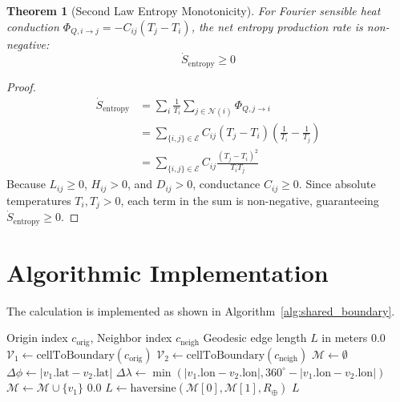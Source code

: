 \documentclass[10pt,twocolumn,letterpaper]{article}
\newtheorem{theorem}{Theorem}
\begin{document}
\begin{theorem}[Second Law Entropy Monotonicity]
For Fourier sensible heat conduction $\Phi_{Q, i \to j} = - C_{ij} (T_j - T_i)$, the net entropy production rate is non-negative:
\begin{equation}
\dot{S}_{\text{entropy}} \ge 0
\end{equation}
\end{theorem}
\begin{proof}
\begin{align}
\dot{S}_{\text{entropy}} &= \sum_{i} \frac{1}{T_i} \sum_{j \in \mathcal{N}(i)} \Phi_{Q, j \to i} \\
&= \sum_{\{i,j\} \in \mathcal{E}} C_{ij} (T_j - T_i) \left(\frac{1}{T_i} - \frac{1}{T_j}\right) \\
&= \sum_{\{i,j\} \in \mathcal{E}} C_{ij} \frac{(T_j - T_i)^2}{T_i T_j}
\end{align}
Because $L_{ij} \ge 0$, $H_{ij} > 0$, and $D_{ij} > 0$, conductance $C_{ij} \ge 0$. Since absolute temperatures $T_i, T_j > 0$, each term in the sum is non-negative, guaranteeing $\dot{S}_{\text{entropy}} \ge 0$.
\end{proof}

\section{Algorithmic Implementation}
The calculation is implemented as shown in Algorithm~\ref{alg:shared_boundary}.

\begin{algorithm}[t]
\caption{Exact H3 Shared Boundary Length}
\label{alg:shared_boundary}
\begin{algorithmic}[1]
\Require Origin index $c_{\text{orig}}$, Neighbor index $c_{\text{neigh}}$
\Ensure Geodesic edge length $L$ in meters
    \State \Return $0.0$
\EndIf
\State $\mathcal{V}_1 \gets \text{cellToBoundary}(c_{\text{orig}})$
\State $\mathcal{V}_2 \gets \text{cellToBoundary}(c_{\text{neigh}})$
\State $\mathcal{M} \gets \emptyset$
        \State $\Delta \phi \gets |v_1.\text{lat} - v_2.\text{lat}|$
        \State $\Delta \lambda \gets \min(|v_1.\text{lon} - v_2.\text{lon}|, 360^\circ - |v_1.\text{lon} - v_2.\text{lon}|)$
                \State $\mathcal{M} \gets \mathcal{M} \cup \{v_1\}$
            \EndIf
        \EndIf
    \EndFor
\EndFor
{}
    \State \Return $0.0$
\EndIf
\State $L \gets \text{haversine}(\mathcal{M}[0], \mathcal{M}[1], R_\oplus)$
\State \Return $L$
\end{algorithmic}
\end{algorithm}
\end{document}
